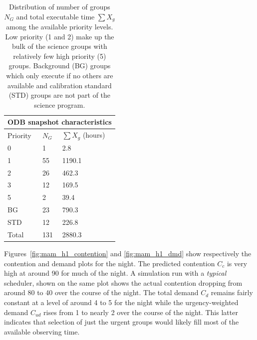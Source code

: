 \begin{table}
\begin{center}
\begin{tabular}{llp{6cm}}
\toprule
\multicolumn{3}{c}{ODB snapshot characteristics} \\
\midrule
Priority & $N_G$ & $\sum{X_g}$ (hours)\\
\midrule
0 & 1 & 2.8\\
1 & 55 & 1190.1\\
2 & 26 & 462.3\\
3 & 12 & 169.5\\
5 & 2  & 39.4\\
BG & 23 & 790.3\\
STD & 12 & 226.8\\
\midrule
Total & 131 & 2880.3\\
\bottomrule
\end{tabular}
\caption[Distribution of number of groups between priority levels for HS1 experiment]{Distribution of number of groups $N_G$ and total executable time $\sum{X_g}$ among the available priority levels. Low priority (1 and 2) make up the bulk of the science groups with relatively few high priority (5) groups. Background (BG) groups which only execute if no others are available and calibration standard (STD) groups are not part of the science program.}
\label{tab:priority_distrib}
\end{center}
\end{table}

Figures~\ref{fig:mam_h1_contention} and \ref{fig:mam_h1_dmd} show respectively the contention and demand plots for the night. The predicted contention $C_c$ is very high at around 90 for much of the night. A simulation run with a \emph{typical} scheduler, shown on the same plot shows the actual contention dropping from around 80 to 40 over the course of the night. The total demand $C_d$ remains fairly constant at a level of around 4 to 5 for the night while the urgency-weighted demand $C_{ud}$ rises from 1 to nearly 2 over the course of the night. This latter indicates that selection of just the urgent groups would likely fill most of the available observing time.

